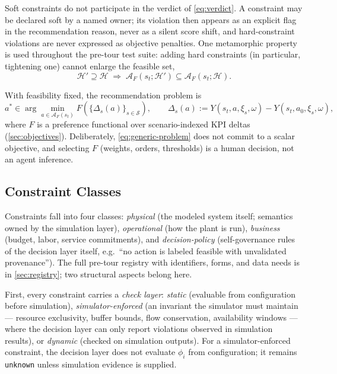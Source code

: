 \documentclass[11pt,a4paper]{article}
\newcommand{\Acal}{\mathcal{A}}
\newcommand{\Scal}{\mathcal{S}}
\newcommand{\Hcal}{\mathcal{H}}
\begin{document}
Soft constraints do not participate in the verdict of \eqref{eq:verdict}. A
constraint may be declared soft by a named owner; its violation then appears
as an explicit flag in the recommendation reason, never as a silent score
shift, and hard-constraint violations are never expressed as objective
penalties. One metamorphic property is used throughout the pre-tour test
suite: adding hard constraints (in particular, tightening one) cannot enlarge
the feasible set,
\begin{equation}\label{eq:monotone}
\Hcal' \supseteq \Hcal
\;\Longrightarrow\;
\Acal_F(s_t; \Hcal') \subseteq \Acal_F(s_t; \Hcal).
\end{equation}

With feasibility fixed, the recommendation problem is
\begin{equation}\label{eq:generic-problem}
a^{*}
\in
\arg\min_{a \in \Acal_F(s_t)}
F\!\left(
\{\Delta_s(a)\}_{s \in \Scal}
\right),
\qquad
\Delta_s(a) := Y(s_t, a, \xi_s, \omega) - Y(s_t, a_0, \xi_s, \omega),
\end{equation}
where $F$ is a preference functional over scenario-indexed KPI deltas
(\cref{sec:objectives}). Deliberately, \eqref{eq:generic-problem} does not
commit to a scalar objective, and selecting $F$ (weights, orders,
thresholds) is a human decision, not an agent inference.

\subsection{Constraint Classes}\label{sec:constraints}

Constraints fall into four classes: \emph{physical} (the modeled system
itself; semantics owned by the simulation layer), \emph{operational} (how
the plant is run), \emph{business} (budget, labor, service commitments), and
\emph{decision-policy} (self-governance rules of the decision layer itself,
e.g.\ ``no action is labeled feasible with unvalidated provenance''). The full
pre-tour registry with identifiers, forms, and data needs is in
\cref{sec:registry}; two structural aspects belong here.

First, every constraint carries a \emph{check layer}: \emph{static}
(evaluable from configuration before simulation), \emph{simulator-enforced}
(an invariant the simulator must maintain --- resource exclusivity, buffer
bounds, flow conservation, availability windows --- where the decision layer
can only report violations observed in simulation results), or \emph{dynamic}
(checked on simulation outputs). For a simulator-enforced constraint, the
decision layer does not evaluate $\phi_i$ from configuration; it remains
\texttt{unknown} unless simulation evidence is supplied.
\end{document}
